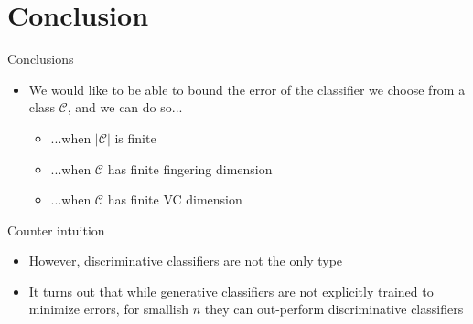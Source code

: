 \documentclass{beamer}
\newcommand{\cls}{\mathcal{C}}
\newcommand{\abs}[1]{\left| #1 \right|}
\begin{document}

\section{Conclusion}
\begin{frame}{Conclusions}
\begin{itemize}
\item We would like to be able to bound the error of the classifier we choose from a class $\cls$, and we can do so...
\begin{itemize}
\item ...when $\abs{\cls}$ is finite
\item ...when $\cls$ has finite fingering dimension
\item ...when $\cls$ has finite VC dimension
\end{itemize}
\end{itemize}
\end{frame}

\begin{frame}{Counter intuition}
\begin{itemize}
\item However, discriminative classifiers are not the only type
\item It turns out that while generative classifiers are not explicitly trained to minimize errors, for smallish $n$ they can out-perform discriminative classifiers
\end{itemize}
\end{frame}


\end{document}
